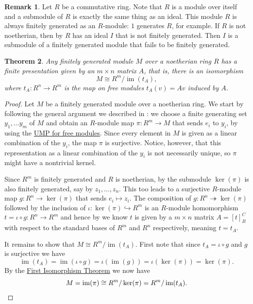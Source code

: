 \documentclass[12pt]{report}
\newtheorem{theorem}{Theorem}[chapter]
\numberwithin{equation}{section}
\numberwithin{theorem}{chapter}
\theoremstyle{definition}
\newtheorem*{basic properties}{Basic Properties}
\newtheorem*{Important Remark}{Important Remark}
\newtheorem{remark}[theorem]{Remark}
\renewcommand{\ker}{\operatorname{ker}}
\DeclareMathOperator{\im}{im}
\begin{document}
\begin{remark}
Let $R$ be a commutative ring. Note that $R$ is a module over itself and a submodule of $R$ is exactly the same thing as an ideal. This module $R$ is always finitely generated as an $R$-module: $1$ generates $R$, for example. If $R$ is not noetherian, then by  $R$ has an ideal $I$ that is not finitely generated. Then $I$ is a submodule of a finitely generated module that fails to be finitely generated.
\end{remark}






\begin{theorem}\label{presentations}
Any finitely generated module $M$ over a noetherian ring $R$ has a finite presentation given by an $m \times n$ matrix $A$, that is, there is an isomorphism
$$M\cong R^m/\im(t_A),$$
where $t_A\!: R^n \to R^m$ is the map on free modules $t_A(v)=Av$ induced by $A$.
\end{theorem}

\begin{proof}
Let $M$ be a finitely generated module over a noetherian ring. We start by following the general argument we described in : we choose a finite generating set $y_1, \dots y_m$ of $M$ and obtain an $R$-module map
$\pi\!: R^m \to M$
that sends $e_i$ to $y_i$, by using the \hyperref[UMPfreemod]{UMP for free modules}. Since every element in $M$ is given as a linear combination of the $y_i$, the map $\pi$ is surjective. Notice, however, that this representation as a linear combination of the $y_i$ is not necessarily unique, so $\pi$ might have a nontrivial kernel. 

Since $R^m$ is finitely generated and $R$ is noetherian, by  the submodule $\ker(\pi)$ is also finitely generated, say by $z_1, \dots, z_n$. This too leads to a
surjective $R$-module map $g\!: R^n \to \ker(\pi)$ that sends $e_i \mapsto z_i$. 
The composition of $g\!: R^n \twoheadrightarrow \ker(\pi)$ followed by the inclusion of $\iota\!: \ker(\pi) \hookrightarrow R^m$ is an $R$-module homomorphism $t=\iota \circ g:R^n \to R^m$ and hence by  we know $t$ is given by a $m \times n$ matrix $A=[t]_B^C$ with respect to the standard bases of $R^m$ and $R^n$ respectively, meaning $t=t_A$. 

It remains to show that $M\cong R^m/\im(t_A)$. First note that since $t_A=\iota \circ g$ and $g$ is surjective we have 
$$\im(t_A)=\im(\iota \circ g)=\iota(\im(g))=\iota(\ker(\pi))=\ker(\pi).$$ 
By the \hyperref[first iso thm]{First Isomorphism Theorem} we now have 
$$M = \im(\pi)\cong R^m/\ker(\pi)= R^m/\im(t_A).\qedhere$$
\end{proof}
\end{document}

